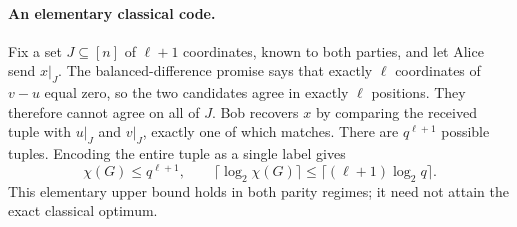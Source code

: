 \documentclass[11pt,a4paper]{article}
\numberwithin{equation}{section}
\numberwithin{figure}{section}
\numberwithin{table}{section}
\numberwithin{footnote}{section}
\theoremstyle{informal}\newtheorem*{informaltheorem}{Informal theorem}
\theoremstyle{definition}\newtheorem{example}{Example}[section]
\theoremstyle{remark}\newtheorem{remark}[theorem]{Remark}
\begin{document}
\paragraph{An elementary classical code.}
Fix a set \(J\subseteq[n]\) of \(\ell+1\) coordinates, known to
both parties, and let Alice send \(x|_J\).
The balanced-difference promise says that exactly \(\ell\)
coordinates of \(v-u\) equal zero, so the two candidates agree
in exactly \(\ell\) positions. They therefore cannot agree on
all of \(J\). Bob recovers \(x\) by comparing the received tuple
with \(u|_J\) and \(v|_J\), exactly one of which matches.
There are \(q^{\ell+1}\) possible tuples. Encoding the entire
tuple as a single label gives
\begin{equation}
 \chi(G)\leq q^{\ell+1},\qquad
 \lceil\log_2\chi(G)\rceil
 \leq\lceil(\ell+1)\log_2 q\rceil.
\end{equation}
This elementary upper bound holds in both parity regimes;
it need not attain the exact classical optimum.
\end{document}
